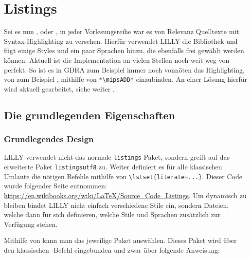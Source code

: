 \renewcommand{\arraystretch}{1.5}
\setlength\intextsep{0pt}
\chapter[Listings \LILLYxBOXxVersion{\small 1.0.0}]{Listings}
Sei es nun \fg[], \eidi oder \gdra[], in jeder Vorlesungsreihe war es von Relevanz Quelltexte mit Syntax-Highlighting zu versehen. Hierfür verwendet LILLY die Bibliothek  und fügt einige Styles und ein paar Sprachen hinzu, die ebenfalls frei gewählt werden können. Aktuell ist die Implementation an vielen Stellen noch weit weg von perfekt. So ist es in GDRA zum Beispiel immer noch vonnöten das Highlighting, von zum Beispiel , mithilfe von \verb|*\mipsADD*| einzubinden. An einer Lösung hierfür wird aktuell gearbeitet, siehe weiter .\normalmarginpar
\section{Die grundlegenden Eigenschaften}
\subsection{Grundlegendes Design}
{\centering {}\vspace*{0.5\baselineskip}\par}

LILLY verwendet nicht das normale \verb|listings|-Paket, sondern greift auf das erweiterte Paket \verb|listingsutf8| zu. Weiter definiert es für alle klassischen Umlaute die nötigen Befehle mithilfe von \verb|\lstset{literate=...}|. Dieser Code wurde folgender Seite entnommen: \url{https://en.wikibooks.org/wiki/LaTeX/Source_Code_Listings}.\newline
Um dynamisch zu bleiben bindet LILLY nicht einfach verschiedene Stile ein, sondern Dateien, welche dann für sich definieren, welche Stile und Sprachen zusätzlich zur Verfügung stehen.\par\reversemarginpar
Mithilfe von  kann man das jeweilige Paket auswählen. Dieses Paket wird über den klassischen \verb||-Befehl eingebunden und zwar über folgende Anweisung:
{\small\begin{lstlisting}[language=lLatex, breaklines=true]

\end{lstlisting}}

